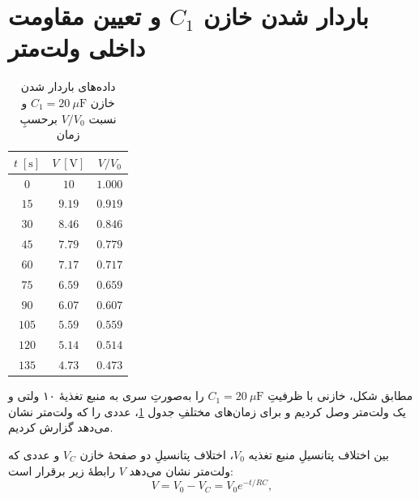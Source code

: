 \documentclass[a4paper, 11pt]{article}
\begin{document}
\section{باردار شدن خازن $C_1$ و تعیین مقاومت داخلی ولت‌متر }
\begin{table} %
\caption{داده‌های باردار شدن خازن \(C_1 = 20~\mu\mathrm{F}\) و نسبت \(V/V_0\) برحسبِ زمان}
\label{tab1}
\centering
\begin{tabular}{ccc}
\hline
$t \;[\mathrm{s}]$ & $V \;[\mathrm{V}]$ & $ V / V_0$ \\
\hline
$0$ & $10$ & $1.000$ \\
$15$ & $9.19$ & $0.919$ \\
$30$ & $8.46$ & $0.846$ \\
$45$ & $7.79$ & $0.779$ \\
$60$ & $7.17$ & $0.717$ \\
$75$ & $6.59$ & $0.659$ \\
$90$ & $6.07$ & $0.607$ \\
$105$ & $5.59$ & $0.559$ \\
$120$ & $5.14$ & $0.514$ \\
$135$ & $4.73$ & $0.473$ \\
\hline
\end{tabular}
\end{table}

مطابق شکل، خازنی با ظرفیتِ $C_1 = 20~\mu\mathrm{F}$ را به‌صورتِ سری به منبع تغذیهٔ ۱۰ ولتی و یک ولت‌متر وصل کردیم و برای زمان‌های مختلفِ جدول \ref{tab1}، عددی را که ولت‌متر نشان می‌دهد گزارش کردیم.


بین اختلاف پتانسیلِ منبع تغذیه $V_0$، اختلاف پتانسیلِ دو صفحهٔ خازن $V_C$ و عددی که ولت‌متر نشان می‌دهد $V$ رابطهٔ زیر برقرار است:
\[
V = V_0 - V_C = V_0 e^{-t/RC},
\]
\end{document}
